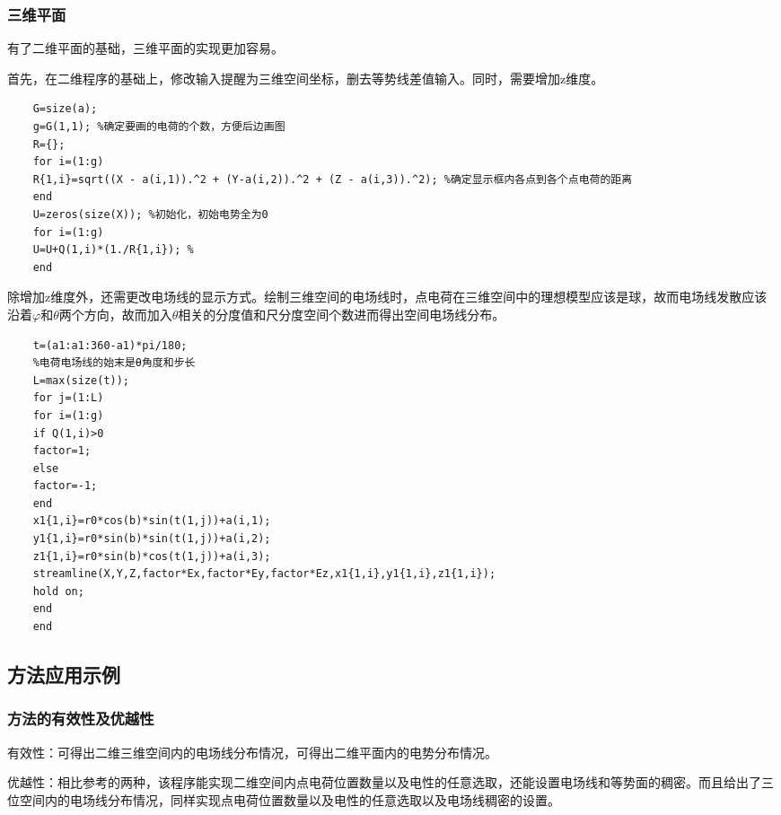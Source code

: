 \documentclass[UTF8]{article}
\numberwithin{figure}{subsection}
\numberwithin{table}{subsection}
\begin{document}
\begin{multicols}{2}
	\subsubsection{三维平面}
	\par 有了二维平面的基础，三维平面的实现更加容易。
	\par 首先，在二维程序的基础上，修改输入提醒为三维空间坐标，删去等势线差值输入。同时，需要增加z维度。
	\begin{lstlisting}
    G=size(a);
    g=G(1,1); %确定要画的电荷的个数，方便后边画图
    R={};
    for i=(1:g) 
    R{1,i}=sqrt((X - a(i,1)).^2 + (Y-a(i,2)).^2 + (Z - a(i,3)).^2); %确定显示框内各点到各个点电荷的距离
    end
    U=zeros(size(X)); %初始化，初始电势全为0
    for i=(1:g)
    U=U+Q(1,i)*(1./R{1,i}); %
    end
	\end{lstlisting}
	\par 除增加z维度外，还需更改电场线的显示方式。绘制三维空间的电场线时，点电荷在三维空间中的理想模型应该是球，故而电场线发散应该沿着$\varphi$和$\theta$两个方向，故而加入$\theta$相关的分度值和尺分度空间个数进而得出空间电场线分布。
	\begin{lstlisting}
    t=(a1:a1:360-a1)*pi/180;
    %电荷电场线的始末是θ角度和步长
    L=max(size(t));
    for j=(1:L)
    for i=(1:g) 
    if Q(1,i)>0
    factor=1;
    else
    factor=-1;
    end
    x1{1,i}=r0*cos(b)*sin(t(1,j))+a(i,1);
    y1{1,i}=r0*sin(b)*sin(t(1,j))+a(i,2);
    z1{1,i}=r0*sin(b)*cos(t(1,j))+a(i,3);
    streamline(X,Y,Z,factor*Ex,factor*Ey,factor*Ez,x1{1,i},y1{1,i},z1{1,i});
    hold on;
    end
    end
	\end{lstlisting}
	\subsection{方法应用示例}
	\subsubsection{方法的有效性及优越性}
	\par 有效性：可得出二维三维空间内的电场线分布情况，可得出二维平面内的电势分布情况。
	\par 优越性：相比参考的两种，该程序能实现二维空间内点电荷位置数量以及电性的任意选取，还能设置电场线和等势面的稠密。而且给出了三位空间内的电场线分布情况，同样实现点电荷位置数量以及电性的任意选取以及电场线稠密的设置。

\end{multicols}
\end{document}
